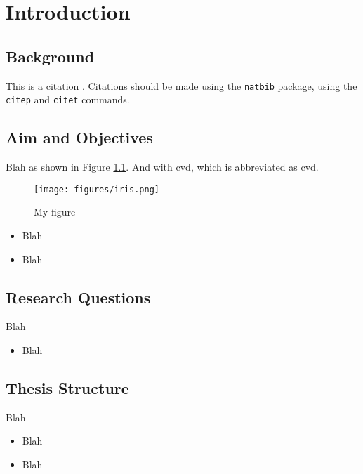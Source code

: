 

\chapter{Introduction}

\section{Background}
This is a citation \citep{van2019sustainable}. Citations should be made using the \texttt{natbib} package, using the \texttt{citep} and \texttt{citet} commands.

\section{Aim and Objectives}
Blah as shown in Figure \ref{fig:fig01}. And with \gls{cvd}, which is abbreviated as \gls{cvd}.

\begin{figure}
  \texttt{[image: figures/iris.png]}
  \caption{My figure}
  \label{fig:fig01}
\end{figure}


\begin{itemize}
\item Blah
\item Blah
\end{itemize}


\section{Research Questions}
Blah

\begin{itemize}
\item Blah 
\end{itemize}

\section{Thesis Structure}
Blah

\begin{itemize}
\item Blah 
\item Blah 
\end{itemize}


